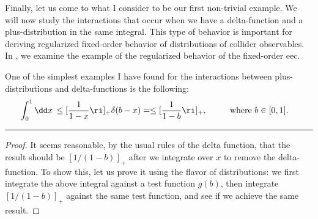 Finally, let us come to what I consider to be our first non-trivial example.
%
We will now study the interactions that occur when we have a delta-function and a plus-distribution in the same integral.
%
This type of behavior is important for deriving regularized fixed-order behavior of distributions of collider observables.
%
In , we examine the example of the regularized behavior of the fixed-order \gls{eec}.
~\\
\begin{example}{}
    One of the simplest examples I have found for the interactions between plus-distributions and delta-functions is the following:
    \begin{align}
        \int_{0}^{1} \dd x\,\le[\frac{1}{1-x}\ri]_+ \delta(b - x)
        &=
        \le[\frac{1}{1-b}\ri]_+
        ,
        ~~~~~~~~
        \text{where}~b \in [0,1].
    \end{align}

\vspace{7pt}
\hrule
\vspace{7pt}

\begin{proof}
It seems reasonable, by the usual rules of the delta function, that the result should be \([1/(1-b)]_+\) after we integrate over \(x\) to remove the delta-function.
%
To show this, let us prove it using the flavor of distributions:
%
we first integrate the above integral against a test function \(g(b)\), then integrate \([1/(1-b)]_+\) against the same test function, and see if we achieve the same result.


\end{proof}
\end{example}
